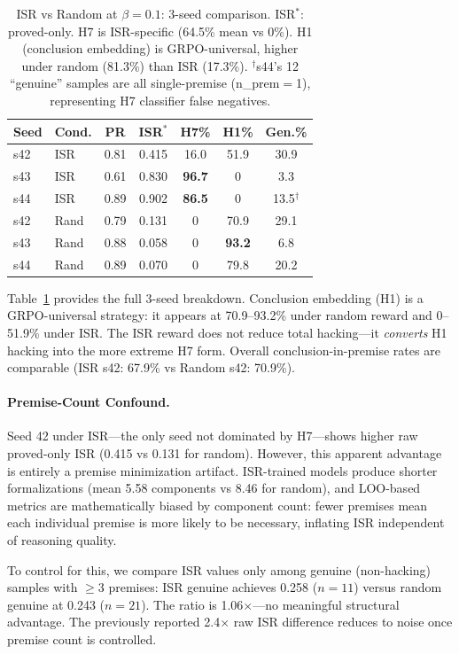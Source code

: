 \begin{table}[t]
\centering
\small
\setlength{\tabcolsep}{3.5pt}
\begin{tabular}{llccccc}
\toprule
\textbf{Seed} & \textbf{Cond.} & \textbf{PR} & \textbf{ISR}$^*$ & \textbf{H7\%} & \textbf{H1\%} & \textbf{Gen.\%} \\
\midrule
s42 & ISR & 0.81 & 0.415 & 16.0 & 51.9 & 30.9 \\
s43 & ISR & 0.61 & 0.830 & \textbf{96.7} & 0 & 3.3 \\
s44 & ISR & 0.89 & 0.902 & \textbf{86.5} & 0 & 13.5$^\dagger$ \\
\midrule
s42 & Rand & 0.79 & 0.131 & 0 & 70.9 & 29.1 \\
s43 & Rand & 0.88 & 0.058 & 0 & \textbf{93.2} & 6.8 \\
s44 & Rand & 0.89 & 0.070 & 0 & 79.8 & 20.2 \\
\bottomrule
\end{tabular}
\caption{ISR vs Random at $\beta{=}0.1$: 3-seed comparison. ISR$^*$: proved-only. H7 is ISR-specific (64.5\% mean vs 0\%). H1 (conclusion embedding) is GRPO-universal, higher under random (81.3\%) than ISR (17.3\%). $^\dagger$s44's 12 ``genuine'' samples are all single-premise (n\_prem$=$1), representing H7 classifier false negatives.}
\label{tab:beta01-3seed}
\end{table}

Table~\ref{tab:beta01-3seed} provides the full 3-seed breakdown. Conclusion embedding (H1) is a GRPO-universal strategy: it appears at 70.9--93.2\% under random reward and 0--51.9\% under ISR. The ISR reward does not reduce total hacking---it \emph{converts} H1 hacking into the more extreme H7 form. Overall conclusion-in-premise rates are comparable (ISR s42: 67.9\% vs Random s42: 70.9\%).

\paragraph{Premise-Count Confound.}
Seed 42 under ISR---the only seed not dominated by H7---shows higher raw proved-only ISR (0.415 vs 0.131 for random). However, this apparent advantage is entirely a premise minimization artifact. ISR-trained models produce shorter formalizations (mean 5.58 components vs 8.46 for random), and LOO-based metrics are mathematically biased by component count: fewer premises mean each individual premise is more likely to be necessary, inflating ISR independent of reasoning quality.

To control for this, we compare ISR values only among genuine (non-hacking) samples with $\geq$3 premises: ISR genuine achieves 0.258 ($n{=}11$) versus random genuine at 0.243 ($n{=}21$). The ratio is 1.06$\times$---no meaningful structural advantage. The previously reported 2.4$\times$ raw ISR difference reduces to noise once premise count is controlled.

